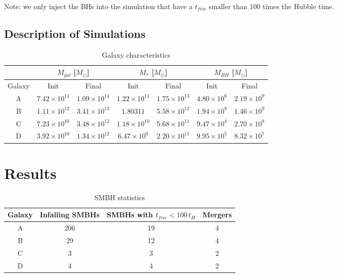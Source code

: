 \documentclass[english, apj]{emulateapj}
\begin{document}
Note: we only inject the BHs into the simulation that have a $t_{fric}$ smaller than 100 times the Hubble time.


\subsection{Description of Simulations}
\begin{table}
\centering
\caption{Galaxy characteristics}
\begin{tabular}{c| c c| c c| c c}
 & \multicolumn{2}{c}{$M_{gal}$ [$M_{\odot}$]} & 
\multicolumn{2}{c}{$M_{*}$ [$M_{\odot}$]} & 
\multicolumn{2}{c}{$M_{BH}$ [$M_{\odot}$]} \\
\hline
Galaxy & Init & Final & Init & Final & Init & Final \\
 \hline
A & $7.42\times10^{11}$ & $1.09\times10^{14}$  & $1.22\times10^{11}$ & $1.75\times10^{13}$ & $4.80\times10^{6}$ & $2.19\times10^{9}$\\
B & $1.11\times10^{12}$ & $3.41\times10^{13}$ & $1.80\mathrm{3}{11}$ & $5.58\times10^{12}$ & $1.94\times10^{8}$ & $1.46\times10^{9}$\\
C & $7.23\times10^{10}$ & $3.48\times10^{12}$ & $1.18\times10^{10}$ & $5.68\times10^{11}$ & $9.47\times10^{4}$ & $2.70\times10^{8}$\\
D & $3.92\times10^{10}$ & $1.34\times10^{12}$ & $6.47\times10^{9}$ & $2.20\times10^{11}$ & $9.95\times10^{5}$ & $8.32\times10^{7}$\\
\end{tabular}
\end{table}





\section{Results}\label{sec:results}
\begin{table}
\centering
\caption{SMBH statistics}
\begin{tabular}{c| c |c |c}
Galaxy & Infalling SMBHs & SMBHs with $t_{fric}<100\,t_H$ & Mergers \\
\hline
A & 206 & 19 & 4 \\
B & 29 & 12 & 4 \\
C & 3 & 3 & 2 \\
D & 4 & 4 & 2 \\
\end{tabular}
\end{table}
\end{document}
